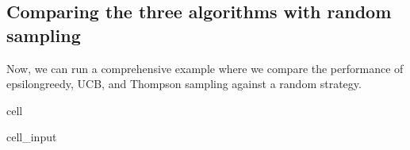 \documentclass[letterpaper,10pt,english]{jupyterBook}
\begin{document}
\subsection{Comparing the three algorithms with random sampling}
\label{\detokenize{notebooks/bandits:comparing-the-three-algorithms-with-random-sampling}}
\sphinxAtStartPar
Now, we can run a comprehensive example where we compare the performance of epsilon\sphinxhyphen{}greedy, UCB, and Thompson sampling against a random strategy.

\begin{sphinxuseclass}{cell}\begin{sphinxVerbatimInput}

\begin{sphinxuseclass}{cell_input}
\begin{sphinxVerbatim}[commandchars=\\\{\}]
  \PYG{p}{[}  \PYG{p}{]}
  
  

     
       
       
        \PYG{p}{[} \PYG{p}{]}    
     


\end{sphinxVerbatim}
\end{sphinxuseclass}
\end{sphinxVerbatimInput}
\end{sphinxuseclass}
\end{document}
